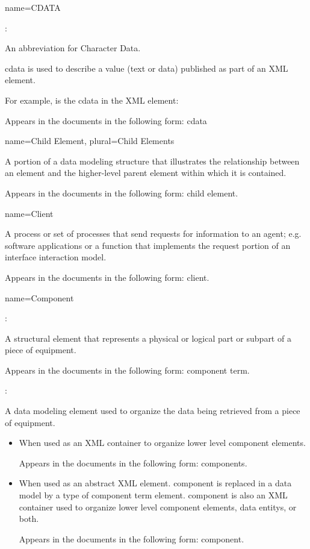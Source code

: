 {
  name={\normalfont CDATA}
}
{
  :

  An abbreviation for Character Data.

  \gls{cdata} is used to describe a value (text or data) published as part of an XML element.

  For example,  is the \gls{cdata} in the XML element:
  
  \tab {}

  Appears in the documents in the following form: \gls{cdata}
}


{
  name={Child Element},
  plural={Child Elements}
}
{
  A portion of a data modeling structure that illustrates the relationship between an element and the higher-level \gls{parent element} within which it is contained.
  
  Appears in the documents in the following form: \gls{child element}.
}


{
  name={Client}
}
{
  A process or set of processes that send \glspl{request} for information to an \gls{agent}; e.g. software applications or a function that implements the \gls{request} portion of an \gls{interface} \gls{interaction model}.

  Appears in the documents in the following form: client.
}

{
  name={Component}
}
{
  :

  A \gls{structural element} that represents a physical or logical part or subpart of a piece of equipment.

  Appears in the documents in the following form: \gls{component term}.

  :

  A data modeling element used to organize the data being retrieved from a piece of equipment.
  
  \begin{itemize}
      \item When used as an XML container to organize \gls{lower level} \gls{component} elements. 
      
      Appears in the documents in the following form: \gls{components}.
      
      \item When used as an abstract XML element. \gls{component} is replaced in a data model by a type of \gls{component term} element. \gls{component} is also an XML container used to organize \gls{lower level} \gls{component} elements, \glspl{data entity}, or both.
      
      Appears in the documents in the following form: \gls{component}.
  \end{itemize}
}

